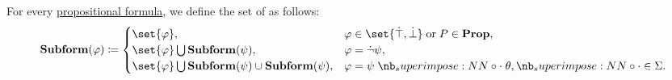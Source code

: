 \begin{definition}\label{def:propositional_subformula}
  For every \hyperref[def:propositional_grammar_schema/formula]{propositional formula}, we define the set of  as follows:
  \begin{equation*}
    \boldop{Subform}(\varphi) \coloneqq \begin{cases}
      \set{ \varphi },                                                            &\varphi \in \set{ \syntop, \synbot } \T{or} P \in \boldop{Prop}, \\
      \set{ \varphi } \bigcup \boldop{Subform}(\psi),                             &\varphi = \synneg \psi, \\
      \set{ \varphi } \bigcup \boldop{Subform}(\psi) \cup \boldop{Subform}(\psi), &\varphi = \psi \syncirc \theta, {\syncirc} \in \Sigma.
    \end{cases}
  \end{equation*}
\end{definition}

